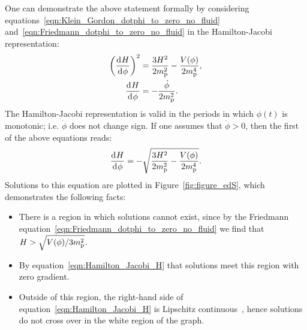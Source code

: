 One can demonstrate the above statement formally by considering equations~\eqref{eqn:Klein_Gordon_dotphi_to_zero_no_fluid} and~\eqref{eqn:Friedmann_dotphi_to_zero_no_fluid} in the Hamilton-Jacobi representation:
\begin{align}
  {\left(\frac{\operatorname{d}^{}\!{H}}{\operatorname{d}^{}\!{\phi}}\right)}^2
  &=
  \frac{3H^2}{2m_{\mathrm{p}}^2} - \frac{V(\phi)}{2m_{\mathrm{p}}^4},
  \\
  \frac{\operatorname{d}^{}\!{H}}{\operatorname{d}^{}\!{\phi}}
  &=
  -\frac{\dot{\phi}}{2m_{\mathrm{p}}^2}.
\end{align}
The Hamilton-Jacobi representation is valid in the periods in which \(\phi(t)\) is monotonic; i.e. \(\dot{\phi}\) does not change sign. If one assumes that \(\dot{\phi}>0\), then the first of the above equations reads:
\begin{equation}
  \frac{\operatorname{d}^{}\!{H}}{\operatorname{d}^{}\!{\phi}} 
  = 
  -\sqrt{\frac{3H^2}{2m_{\mathrm{p}}^2} - \frac{V(\phi)}{2m_{\mathrm{p}}^4}}.
  \label{eqn:Hamilton_Jacobi_H}
\end{equation}
Solutions to this equation are plotted in Figure~\ref{fig:figure_edS}, which demonstrates the following facts: 
\begin{itemize}
  \item There is a region in which solutions cannot exist, since by the Friedmann equation~\eqref{eqn:Friedmann_dotphi_to_zero_no_fluid} we find that \(H>\sqrt{V(\phi)/3m_{\mathrm{p}}^2}\).
  \item  By equation~\eqref{eqn:Hamilton_Jacobi_H} that solutions meet this region with zero gradient.
  \item Outside of this region, the right-hand side of equation~\eqref{eqn:Hamilton_Jacobi_H} is Lipschitz continuous~\citep[see Section~\ref{sec:uniqueness_theorem}, or][]{agarwal_1993}, hence solutions do not cross over in the white region of the graph.
\end{itemize}
% 


